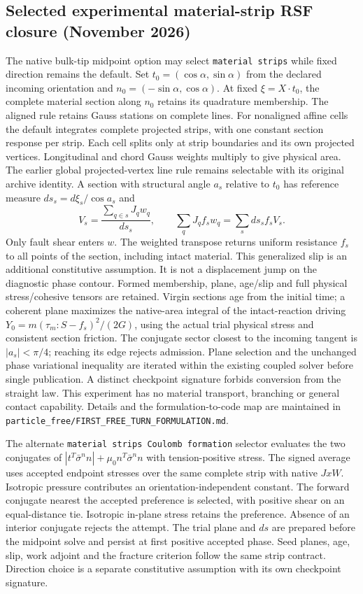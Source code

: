 \documentclass[11pt]{article}
\begin{document}
\subsection{Selected experimental material-strip RSF closure (November 2026)}
The native bulk-tip midpoint option may select \texttt{material strips} while
fixed direction remains the default. Set $t_0=(\cos\alpha,\sin\alpha)$ from the declared incoming orientation
and $n_0=(-\sin\alpha,\cos\alpha)$. At fixed $\xi=X\cdot t_0$, the complete
material section along $n_0$ retains its quadrature membership. The aligned rule retains Gauss stations on complete lines. For nonaligned
affine cells the default integrates complete projected strips, with one
constant section response per strip. Each cell splits only at strip boundaries
and its own projected vertices. Longitudinal and chord Gauss weights multiply
to give physical area. The earlier global projected-vertex line rule remains
selectable with its original archive identity. A section with structural angle
$a_s$ relative to $t_0$ has reference measure $d s_s=d\xi_s/\cos a_s$ and
\[
 V_s=\frac{\sum_{q\in s}J_q w_q}{d s_s},\qquad
 \sum_q J_q f_s w_q=\sum_s d s_s f_s V_s.
\]
Only fault shear enters $w$. The weighted transpose returns uniform resistance
$f_s$ to all points of the section, including intact material. This generalized
slip is an additional constitutive assumption. It is not a displacement jump
on the diagnostic phase contour. Formed membership, plane, age/slip and full
physical stress/cohesive tensors are retained. Virgin sections age from the
initial time; a coherent plane maximizes the native-area integral of the
intact-reaction driving $Y_0=m(\tau_m:S-f_s)^2/(2G)$, using the actual trial
physical stress and consistent section friction. The conjugate sector closest
to the incoming tangent is $|a_s|<\pi/4$; reaching its edge rejects admission.
Plane selection and the unchanged phase variational inequality are iterated
within the existing coupled solver before single publication. A distinct
checkpoint signature forbids conversion from the straight law. This experiment
has no material transport, branching or general contact capability. Details
and the formulation-to-code map are maintained in
\texttt{particle\_free/FIRST\_FREE\_TURN\_FORMULATION.md}.


The alternate \texttt{material strips Coulomb formation} selector evaluates
the two conjugates of $|t^T\bar\sigma^n n|+\mu_0 n^T\bar\sigma^n n$ with
tension-positive stress. The signed average uses accepted endpoint stresses
over the same complete strip with native $JxW$. Isotropic pressure contributes
an orientation-independent constant. The forward conjugate nearest the accepted
preference is selected, with positive shear on an equal-distance tie.
Isotropic in-plane stress retains the preference. Absence of an interior
conjugate rejects the attempt. The trial plane and $ds$ are prepared before
the midpoint solve and persist at first positive accepted phase. Seed planes,
age, slip, work adjoint and the fracture criterion follow the same strip
contract. Direction choice is a separate constitutive assumption with its own
checkpoint signature.
\end{document}
